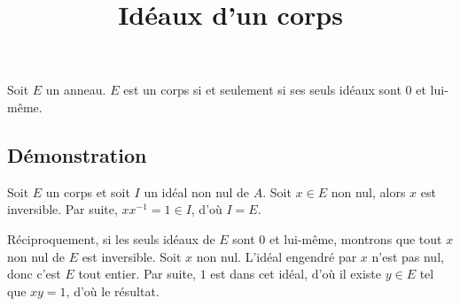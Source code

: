 \documentclass[fontsize=12pt,twoside=false,parskip=half, french]{scrartcl}
\title{Idéaux d’un corps}
\date{}
\author{}
\begin{document}
\maketitle
   \begin{Theoreme}
      Soit $E$ un anneau. $E$ est un corps si et seulement si ses seuls idéaux sont ${0}$ et lui-même.
   \end{Theoreme}
   \subsection{Démonstration}
      Soit $E$ un corps et soit $I$ un idéal non nul de $A$. Soit $x \in E$ non nul, alors $x$ est
      inversible. Par suite, $xx^{-1} = 1 \in I$, d’où $I = E$.
      
      Réciproquement, si les seuls idéaux de $E$ sont ${0}$ et lui-même, montrons que tout $x$ 
      non nul de $E$ est inversible. Soit $x$ non nul. L’idéal engendré par $x$ n’est pas nul, 
      donc c’est $E$ tout entier. Par suite, $1$ est dans cet idéal, d’où il existe $y \in E$
      tel que $xy = 1$, d’où le résultat. 
\end{document}
